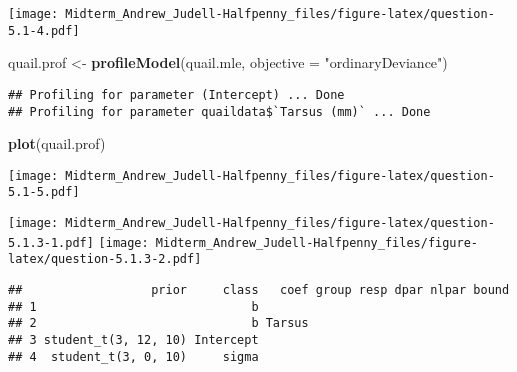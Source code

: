 \documentclass[]{article}
\newenvironment{Shaded}{\begin{snugshade}}{\end{snugshade}}
\newcommand{\KeywordTok}[1]{\textcolor[rgb]{0.13,0.29,0.53}{\textbf{#1}}}
\newcommand{\DataTypeTok}[1]{\textcolor[rgb]{0.13,0.29,0.53}{#1}}
\newcommand{\StringTok}[1]{\textcolor[rgb]{0.31,0.60,0.02}{#1}}
\newcommand{\OperatorTok}[1]{\textcolor[rgb]{0.81,0.36,0.00}{\textbf{#1}}}
\newcommand{\NormalTok}[1]{#1}
\begin{document}
\texttt{[image: Midterm\_Andrew\_Judell-Halfpenny\_files/figure-latex/question-5.1-4.pdf]}

\begin{Shaded}
\begin{Highlighting}[]
\NormalTok{quail.prof <-}\StringTok{ }\KeywordTok{profileModel}\NormalTok{(quail.mle,}
                     \DataTypeTok{objective =} \StringTok{"ordinaryDeviance"}\NormalTok{)}
\end{Highlighting}
\end{Shaded}

\begin{verbatim}
## Profiling for parameter (Intercept) ... Done
## Profiling for parameter quaildata$`Tarsus (mm)` ... Done
\end{verbatim}

\begin{Shaded}
\begin{Highlighting}[]
\KeywordTok{plot}\NormalTok{(quail.prof)}
\end{Highlighting}
\end{Shaded}

\texttt{[image: Midterm\_Andrew\_Judell-Halfpenny\_files/figure-latex/question-5.1-5.pdf]}

\begin{Shaded}
\end{Shaded}

\texttt{[image: Midterm\_Andrew\_Judell-Halfpenny\_files/figure-latex/question-5.1.3-1.pdf]}
\texttt{[image: Midterm\_Andrew\_Judell-Halfpenny\_files/figure-latex/question-5.1.3-2.pdf]}

\begin{verbatim}
##                  prior     class   coef group resp dpar nlpar bound
## 1                              b                                   
## 2                              b Tarsus                            
## 3 student_t(3, 12, 10) Intercept                                   
## 4  student_t(3, 0, 10)     sigma
\end{verbatim}
\end{document}
